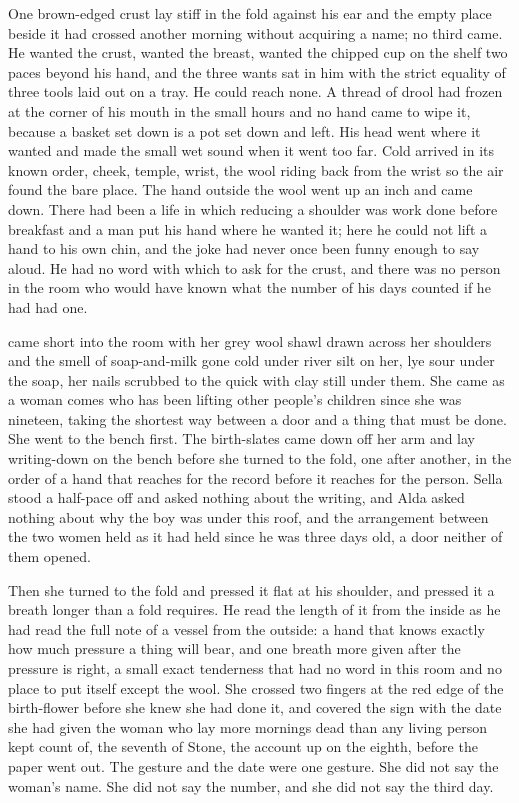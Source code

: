 One brown-edged crust lay stiff in the fold against his ear and the empty place beside it had crossed another morning without acquiring a name; no third came. He wanted the crust, wanted the breast, wanted the chipped cup on the shelf two paces beyond his hand, and the three wants sat in him with the strict equality of three tools laid out on a tray. He could reach none. A thread of drool had frozen at the corner of his mouth in the small hours and no hand came to wipe it, because a basket set down is a pot set down and left. His head went where it wanted and made the small wet sound when it went too far. Cold arrived in its known order, cheek, temple, wrist, the wool riding back from the wrist so the air found the bare place. The hand outside the wool went up an inch and came down. There had been a life in which reducing a shoulder was work done before breakfast and a man put his hand where he wanted it; here he could not lift a hand to his own chin, and the joke had never once been funny enough to say aloud. He had no  word with which to ask for the crust, and there was no person in the room who would have known what the number of his days counted if he had had one.

\scenebreak

 came short into the room with her grey wool shawl drawn across her shoulders and the smell of soap-and-milk gone cold under river silt on her, lye sour under the soap, her nails scrubbed to the quick with clay still under them. She came as a woman comes who has been lifting other people's children since she was nineteen, taking the shortest way between a door and a thing that must be done. She went to the bench first. The birth-slates came down off her arm and lay writing-down on the bench before she turned to the fold, one after another, in the order of a hand that reaches for the record before it reaches for the person. Sella stood a half-pace off and asked nothing about the writing, and Alda asked nothing about why the boy was under this roof, and the arrangement between the two women held as it had held since he was three days old, a door neither of them opened.

Then she turned to the fold and pressed it flat at his shoulder, and pressed it a breath longer than a fold requires. He read the length of it from the inside as he had read the full note of a vessel from the outside: a hand that knows exactly how much pressure a thing will bear, and one breath more given after the pressure is right, a small exact tenderness that had no word in this room and no place to put itself except the wool. She crossed two fingers at the red edge of the birth-flower before she knew she had done it, and covered the sign with the date she had given the woman who lay more mornings dead than any living person kept count of, the seventh of Stone, the account up on the eighth, before the paper went out. The gesture and the date were one gesture. She did not say the woman's name. She did not say the number, and she did not say the third day.

